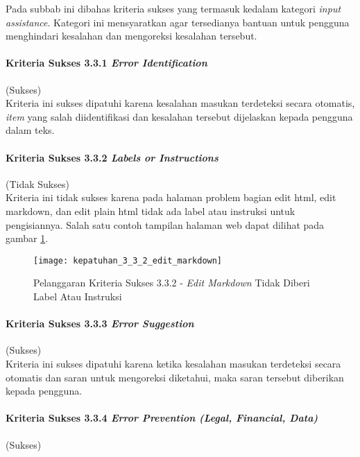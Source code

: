 Pada subbab ini dibahas kriteria sukses yang termasuk kedalam kategori \textit{input assistance}. Kategori ini mensyaratkan agar tersedianya bantuan untuk pengguna menghindari kesalahan dan mengoreksi kesalahan tersebut.

\paragraph{Kriteria Sukses 3.3.1 \textit{Error Identification}}
\label{subsubsec:kepatuhan_kriteria_3.3.1}
(Sukses)\\

Kriteria ini sukses dipatuhi karena kesalahan masukan terdeteksi secara otomatis, \textit{item} yang salah diidentifikasi dan kesalahan tersebut dijelaskan kepada pengguna dalam teks.

\paragraph{Kriteria Sukses 3.3.2 \textit{Labels or Instructions}}
\label{subsubsec:kepatuhan_kriteria_3.3.2}
(Tidak Sukses) \\

Kriteria ini tidak sukses karena pada halaman problem bagian edit html, edit markdown, dan edit plain html tidak ada label atau instruksi untuk pengisiannya. Salah satu contoh tampilan halaman web dapat dilihat pada gambar \ref{fig:kepatuhan_3_3_2_edit_markdown}.
\begin{figure}[H]
	\centering  
	\texttt{[image: kepatuhan\_3\_3\_2\_edit\_markdown]}  
	\caption[Pelanggaran Kriteria Sukses 3.3.2 - \textit{Edit Markdown} Tidak Diberi Label Atau Instruksi]{Pelanggaran Kriteria Sukses 3.3.2 - \textit{Edit Markdown} Tidak Diberi Label Atau Instruksi} 
	\label{fig:kepatuhan_3_3_2_edit_markdown} 
\end{figure}

\paragraph{Kriteria Sukses 3.3.3 \textit{Error Suggestion}}
\label{subsubsec:kepatuhan_kriteria_3.3.3}
(Sukses) \\

Kriteria ini sukses dipatuhi karena ketika kesalahan masukan terdeteksi secara otomatis dan saran untuk mengoreksi diketahui, maka saran tersebut diberikan kepada pengguna.

\paragraph{Kriteria Sukses 3.3.4 \textit{Error Prevention (Legal, Financial, Data)}}
\label{subsubsec:kepatuhan_kriteria_3.3.4}
(Sukses) \\

